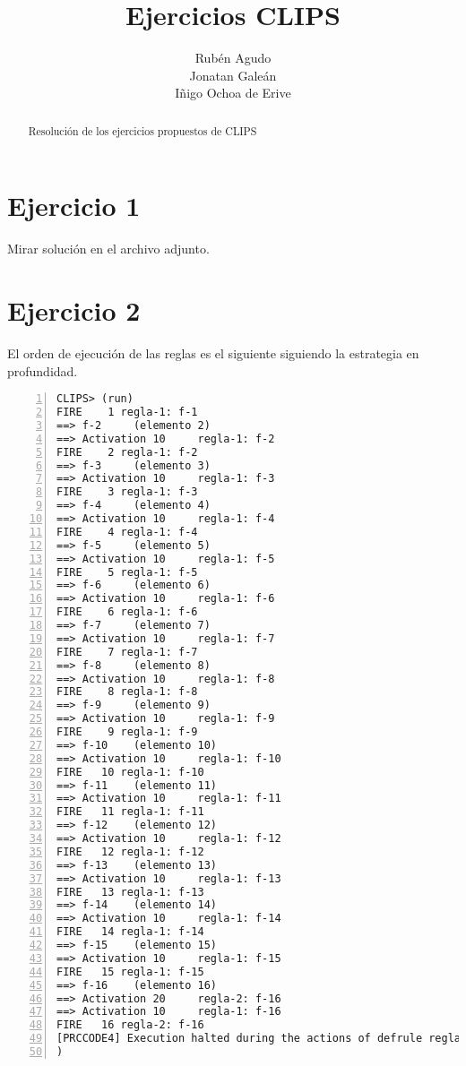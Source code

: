 \documentclass[12pt]{article}
\title{Ejercicios CLIPS}
\author{Rub\'{e}n Agudo\\
        Jonatan Gale\'{a}n \\
        I\~{n}igo Ochoa de Erive}
\begin{document}
\maketitle

\begin{abstract}
    Resoluci\'{o}n de los ejercicios propuestos de CLIPS
\end{abstract}

\section{Ejercicio 1}
Mirar soluci\'{o}n en el archivo adjunto.
\section{Ejercicio 2}
El orden de ejecuci\'{o}n de las reglas es el siguiente siguiendo la
estrategia en profundidad.
\begin{lstlisting}[breaklines=true, 
numbers=left, showspaces=false]
CLIPS> (run)
FIRE    1 regla-1: f-1
==> f-2     (elemento 2)
==> Activation 10     regla-1: f-2
FIRE    2 regla-1: f-2
==> f-3     (elemento 3)
==> Activation 10     regla-1: f-3
FIRE    3 regla-1: f-3
==> f-4     (elemento 4)
==> Activation 10     regla-1: f-4
FIRE    4 regla-1: f-4
==> f-5     (elemento 5)
==> Activation 10     regla-1: f-5
FIRE    5 regla-1: f-5
==> f-6     (elemento 6)
==> Activation 10     regla-1: f-6
FIRE    6 regla-1: f-6
==> f-7     (elemento 7)
==> Activation 10     regla-1: f-7
FIRE    7 regla-1: f-7
==> f-8     (elemento 8)
==> Activation 10     regla-1: f-8
FIRE    8 regla-1: f-8
==> f-9     (elemento 9)
==> Activation 10     regla-1: f-9
FIRE    9 regla-1: f-9
==> f-10    (elemento 10)
==> Activation 10     regla-1: f-10
FIRE   10 regla-1: f-10
==> f-11    (elemento 11)
==> Activation 10     regla-1: f-11
FIRE   11 regla-1: f-11
==> f-12    (elemento 12)
==> Activation 10     regla-1: f-12
FIRE   12 regla-1: f-12
==> f-13    (elemento 13)
==> Activation 10     regla-1: f-13
FIRE   13 regla-1: f-13
==> f-14    (elemento 14)
==> Activation 10     regla-1: f-14
FIRE   14 regla-1: f-14
==> f-15    (elemento 15)
==> Activation 10     regla-1: f-15
FIRE   15 regla-1: f-15
==> f-16    (elemento 16)
==> Activation 20     regla-2: f-16
==> Activation 10     regla-1: f-16
FIRE   16 regla-2: f-16
[PRCCODE4] Execution halted during the actions of defrule regla-2.
)
\end{lstlisting}
\end{document}
